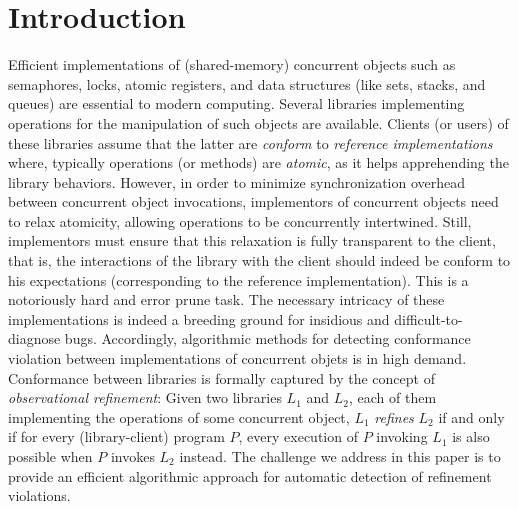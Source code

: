\section{Introduction}


Efficient implementations of (shared-memory) concurrent objects such as semaphores, locks, atomic registers, and data structures (like sets, stacks, and queues) are essential to modern computing. Several libraries implementing operations for the manipulation of such objects are available. Clients (or users) of these libraries assume that the latter are {\em conform} to {\em reference implementations} where, typically operations (or methods) are {\em atomic}, as it helps apprehending the library behaviors. However, in order to minimize synchronization overhead between concurrent object invocations, implementors of concurrent objects need to relax atomicity, allowing operations to be concurrently intertwined. Still, implementors must ensure that this relaxation is fully transparent to the client, that is, the interactions of the library with the client should indeed be conform to his expectations (corresponding to the reference implementation). This is a notoriously hard and error prune task. The necessary intricacy of these implementations is indeed a breeding ground for insidious and difficult-to-diagnose bugs. Accordingly, algorithmic methods for detecting conformance violation between implementations of concurrent objets is in high demand.
%
Conformance between libraries is formally captured by the concept of {\em observational refinement}: Given two libraries $L_1$ and $L_2$, each of them implementing the operations of some concurrent object, $L_1$ {\em refines} $L_2$ if and only if for every (library-client) program $P$, every execution of $P$ invoking $L_1$ is also possible when $P$ invokes $L_2$ instead. 
%
The challenge we address in this paper is to provide an efficient algorithmic approach for automatic detection of refinement violations. 

